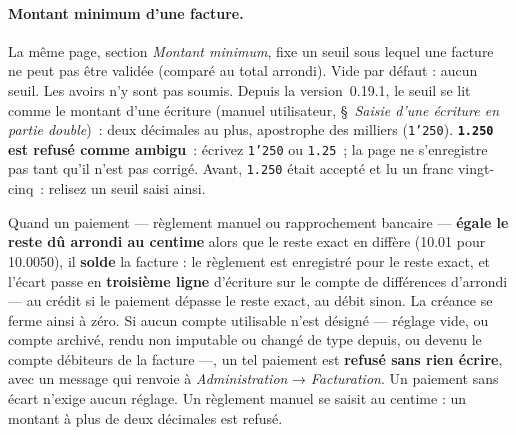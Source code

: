 \documentclass[a4paper,11pt,oneside]{article}
\begin{document}
\paragraph{Montant minimum d'une facture.} La même page, section \emph{Montant minimum}, fixe un seuil sous lequel une facture ne peut pas être validée (comparé au total arrondi). Vide par défaut : aucun seuil. Les avoirs n'y sont pas soumis. Depuis la version~0.19.1, le seuil se lit comme le montant d'une écriture (manuel utilisateur, \S~\emph{Saisie d'une écriture en partie double})~: deux décimales au plus, apostrophe des milliers (\texttt{1'250}). \textbf{\texttt{1.250} est refusé comme ambigu}~: écrivez \texttt{1'250} ou \texttt{1.25}~; la page ne s'enregistre pas tant qu'il n'est pas corrigé. Avant, \texttt{1.250} était accepté et lu un franc vingt-cinq~: relisez un seuil saisi ainsi.

Quand un paiement --- règlement manuel ou rapprochement bancaire --- \textbf{égale le reste dû arrondi au centime} alors que le reste exact en diffère (10.01 pour 10.0050), il \textbf{solde} la facture : le règlement est enregistré pour le reste exact, et l'écart passe en \textbf{troisième ligne} d'écriture sur le compte de différences d'arrondi --- au crédit si le paiement dépasse le reste exact, au débit sinon. La créance se ferme ainsi à zéro. Si aucun compte utilisable n'est désigné --- réglage vide, ou compte archivé, rendu non imputable ou changé de type depuis, ou devenu le compte débiteurs de la facture ---, un tel paiement est \textbf{refusé sans rien écrire}, avec un message qui renvoie à \emph{Administration} → \emph{Facturation}. Un paiement sans écart n'exige aucun réglage. Un règlement manuel se saisit au centime : un montant à plus de deux décimales est refusé.
\end{document}
